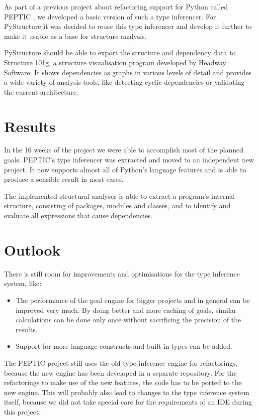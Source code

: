 \documentclass[12pt,halfparskip,DIV11,BCOR10mm]{scrreprt}
\begin{document}
As part of a previous project about refactoring support for Python called PEPTIC \cite{peptic2}, we developed a basic version of such a type inferencer. For PyStructure it was decided to reuse this type inferencer and develop it further to make it usable as a base for structure analysis.

PyStructure should be able to export the structure and dependency data to Structure 101g, a structure visualisation program developed by Headway Software. It shows dependencies as graphs in various levels of detail and provides a wide variety of analysis tools, like detecting cyclic dependencies or validating the current architecture.

\section*{Results}

In the 16 weeks of the project we were able to accomplish most of the planned goals. PEPTIC's type inferencer was extracted and moved to an independent new project. It now supports almost all of Python's language features and is able to produce a sensible result in most cases.

The implemented structural analyser is able to extract a program's internal structure, consisting of packages, modules and classes, and to identify and evaluate all expressions that cause dependencies.

\section*{Outlook}

There is still room for improvements and optimisations for the type inference system, like:

\begin{itemize}
    \item The performance of the goal engine for bigger projects and in general can be improved very much. By doing better and more caching of goals, similar calculations can be done only once without sacrificing the precision of the results.
    \item Support for more language constructs and built-in types can be added.
\end{itemize}

The PEPTIC project still uses the old type inference engine for refactorings, because the new engine has been developed in a separate repository. For the refactorings to make use of the new features, the code has to be ported to the new engine. This will probably also lead to changes to the type inference system itself, because we did not take special care for the requirements of an IDE during this project.
\end{document}
